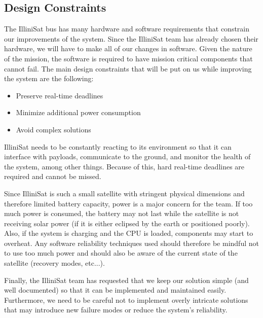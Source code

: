 \subsection{Design Constraints}
The IlliniSat bus has many hardware and software requirements that constrain our
improvements of the system. Since the IlliniSat team has already chosen their
hardware, we will have to make all of our changes in software. Given the nature
of the mission, the software is required to have mission critical components
that cannot fail. The main design constraints that will be put on us while
improving the system are the following:
\begin{itemize}
  \item Preserve real-time deadlines
  \item Minimize additional power consumption
  \item Avoid complex solutions
\end{itemize}
IlliniSat needs to be constantly reacting to its environment so that it can
interface with payloads, communicate to the ground, and monitor the health of
the system, among other things. Because of this, hard real-time deadlines are
required and cannot be missed. 

Since IlliniSat is such a small satellite with stringent physical dimensions and
therefore limited battery capacity, power is a major concern for the team.  If
too much power is consumed, the battery may not last while the satellite is not
receiving solar power (if it is either eclipsed by the earth or positioned
poorly).  Also, if the system is charging and the CPU is loaded, components may
start to overheat.  Any software reliability techniques used should therefore be
mindful not to use too much power and should also be aware of the current state
of the satellite (recovery modes, etc...).

Finally, the IlliniSat team has requested that we keep our solution simple (and
well documented) so that it can be implemented and maintained easily.
Furthermore, we need to be careful not to implement overly intricate solutions
that may introduce new failure modes or reduce the system's reliability.
